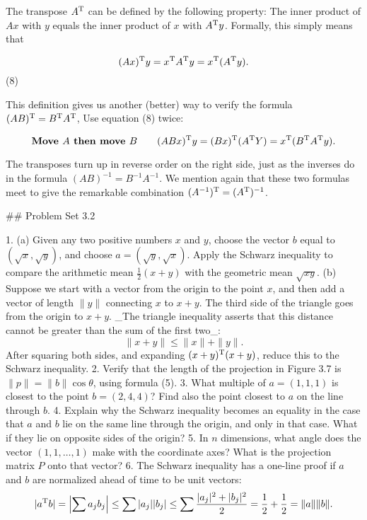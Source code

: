 The transpose \(A^{\rm T}\) can be defined by the following property: The inner product of \(Ax\) with \(y\) equals the inner product of \(x\) with \(A^{\rm T}y\). Formally, this simply means that

\[(Ax)^{\rm T}y=x^{\rm T}A^{\rm T}y=x^{\rm T}(A^{\rm T}y).\] (8)

This definition gives us another (better) way to verify the formula \((AB)^{\rm T}=B^{\rm T}A^{\rm T}\), Use equation (8) twice:

\[\mbox{\bf Move $A$ then move $B$}\qquad(ABx)^{\rm T}y=(Bx)^{\rm T}(A^{\rm T}Y)=x^{ \rm T}(B^{\rm T}A^{\rm T}y).\]

The transposes turn up in reverse order on the right side, just as the inverses do in the formula \((AB)^{-1}=B^{-1}A^{-1}\). We mention again that these two formulas meet to give the remarkable combination \((A^{-1})^{\rm T}=(A^{\rm T})^{-1}\).

## Problem Set 3.2

1. (a) Given any two positive numbers \(x\) and \(y\), choose the vector \(b\) equal to \((\sqrt{x},\sqrt{y})\), and choose \(a=(\sqrt{y},\sqrt{x})\). Apply the Schwarz inequality to compare the arithmetic mean \(\frac{1}{2}(x+y)\) with the geometric mean \(\sqrt{xy}\). (b) Suppose we start with a vector from the origin to the point \(x\), and then add a vector of length \(\|y\|\) connecting \(x\) to \(x+y\). The third side of the triangle goes from the origin to \(x+y\). _The triangle inequality asserts that this distance cannot be greater than the sum of the first two_: \[\|x+y\|\leq\|x\|+\|y\|.\] After squaring both sides, and expanding \((x+y)^{\rm T}(x+y)\), reduce this to the Schwarz inequality.
2. Verify that the length of the projection in Figure 3.7 is \(\|p\|=\|b\|\cos\theta\), using formula (5).
3. What multiple of \(a=(1,1,1)\) is closest to the point \(b=(2,4,4)\)? Find also the point closest to \(a\) on the line through \(b\).
4. Explain why the Schwarz inequality becomes an equality in the case that \(a\) and \(b\) lie on the same line through the origin, and only in that case. What if they lie on opposite sides of the origin?
5. In \(n\) dimensions, what angle does the vector \((1,1,\ldots,1)\) make with the coordinate axes? What is the projection matrix \(P\) onto that vector?
6. The Schwarz inequality has a one-line proof if \(a\) and \(b\) are normalized ahead of time to be unit vectors: \[|a^{\rm T}b|=\left|\sum a_{j}b_{j}\right|\leq\sum|a_{j}||b_{j}|\leq\sum\frac{ |a_{j}|^{2}+|b_{j}|^{2}}{2}=\frac{1}{2}+\frac{1}{2}=\|a\|\|b\|.\] 
